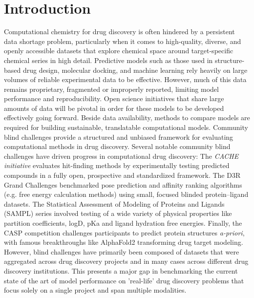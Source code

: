 \documentclass[journal=jacsat,manuscript=article]{achemso}
\begin{document}
\section{Introduction}
Computational chemistry for drug discovery is often hindered by a persistent data shortage problem, particularly when it comes to high-quality, diverse, and openly accessible datasets that explore chemical space around target-specific chemical series in high detail. Predictive models such as those used in structure-based drug design, molecular docking, and machine learning rely heavily on large volumes of reliable experimental data to be effective. However, much of this data remains proprietary, fragmented or improperly reported, limiting model performance and reproducibility. Open science initiatives that share large amounts of data will be pivotal in order for these models to be developed effectively going forward. 
Beside data availability, methods to compare models are required for building sustainable, translatable computational models. Community blind challenges provide a structured and unbiased framework for evaluating computational methods in drug discovery. Several notable community blind challenges have driven progress in computational drug discovery: 
The \textit{CACHE initiative}\cite{ackloo_al-awar_amaro_arrowsmith_azevedo_al._2022} evaluates hit-finding methods by experimentally testing predicted compounds in a fully open, prospective and standardized framework. The D3R Grand Challenges\cite{parks_gaieb_chiu_yang_shao_walters_jansen_mcgaughey_lewis_bembenek_et} benchmarked pose prediction and affinity ranking algorithms (e.g. free energy calculation methods) using small, focused blinded protein–ligand datasets. The Statistical Assessment of Modeling of Proteins and Ligands (SAMPL) series\cite{amezcua_setiadi_mobley_2024} involved testing of a wide variety of physical properties like partition coefficients, logD, pKa and ligand hydration free energies. Finally, the CASP competition\cite{andriy_kryshtafovych_schwede_topf_krzysztof_2019} challenges participants to predict protein structures \textit{a-priori}, with famous breakthroughs like AlphaFold2 transforming drug target modeling.\cite{jumper_evans_pritzel_green_figurnov_ronneberger_tunyasuvunakool_bates_žídek_2021} However, blind challenges have primarily been composed of datasets that were aggregated across drug discovery projects and in many cases across different drug discovery institutions. This presents a major gap in benchmarking the current state of the art of model performance on 'real-life' drug discovery problems that focus solely on a single project and span multiple modalities. 
\end{document}
